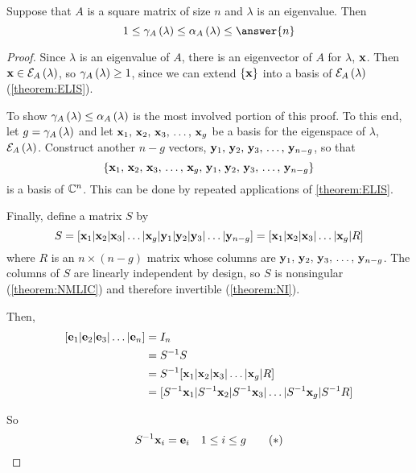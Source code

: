 \documentclass{ximera}
\begin{document}
\begin{theorem}
\label{theorem:ME}

Suppose that $A$ is a square matrix of size $n$ and $\lambda$ is an eigenvalue.  Then
\[
1\leq\geomult{A}{\lambda}\leq\algmult{A}{\lambda}\leq \answer{n}
\]

\begin{proof}
Since $\lambda$ is an eigenvalue of $A$, there is an eigenvector of $A$ for $\lambda$, $\mathbf{x}$.  Then $\mathbf{x}\in\mathcal{E}_{A}\left(\lambda\right)$, so $\gamma_{A}\left(\lambda\right)\geq 1$, since we can extend $\left\{\mathbf{x}\right\}$ into a basis of $\mathcal{E}_{A}\left(\lambda\right)$ (\ref{theorem:ELIS}).

To show $\gamma_{A}\left(\lambda\right)\leq\alpha_{A}\left(\lambda\right)$ is the most involved portion of this proof.  To this end, let $g=\gamma_{A}\left(\lambda\right)$ and let $\mathbf{x}_{1},\,\mathbf{x}_{2},\,\mathbf{x}_{3},\,\ldots,\,\mathbf{x}_{g}$ be a basis for the eigenspace of $\lambda$, $\mathcal{E}_{A}\left(\lambda\right)$.  Construct another $n-g$ vectors, $\mathbf{y}_{1},\,\mathbf{y}_{2},\,\mathbf{y}_{3},\,\ldots,\,\mathbf{y}_{n-g}$, so that
\[
\left\{\mathbf{x}_{1},\,\mathbf{x}_{2},\,\mathbf{x}_{3},\,\ldots,\,\mathbf{x}_{g},\,\mathbf{y}_{1},\,\mathbf{y}_{2},\,\mathbf{y}_{3},\,\ldots,\,\mathbf{y}_{n-g}\right\}
\]
is a basis of $\mathbb{C}^{n}$.  This can be done by repeated applications of \ref{theorem:ELIS}.



Finally, define a matrix $S$ by
\[
S=[\mathbf{x}_1|\mathbf{x}_2|\mathbf{x}_3|\ldots|\mathbf{x}_g|\mathbf{y}_1|\mathbf{y}_2|\mathbf{y}_3|\ldots|\mathbf{y}_{n-g}]
=[\mathbf{x}_1|\mathbf{x}_2|\mathbf{x}_3|\ldots|\mathbf{x}_g|R]
\]
where $R$ is an $n\times(n-g)$ matrix whose columns are $\mathbf{y}_{1},\,\mathbf{y}_{2},\,\mathbf{y}_{3},\,\ldots,\,\mathbf{y}_{n-g}$.  The columns of $S$ are linearly independent by design, so $S$ is nonsingular (\ref{theorem:NMLIC}) and therefore invertible (\ref{theorem:NI}).



Then,
\begin{align*}
\left\lbrack\mathbf{e}_{1}|\mathbf{e}_{2}|\mathbf{e}_{3}|\ldots|\mathbf{e}_{n}\right\rbrack&=I_n\\
&=S^{-1}S\\
&=S^{-1}[\mathbf{x}_1|\mathbf{x}_2|\mathbf{x}_3|\ldots|\mathbf{x}_g|R]\\
&=[S^{-1}\mathbf{x}_1|S^{-1}\mathbf{x}_2|S^{-1}\mathbf{x}_3|\ldots|S^{-1}\mathbf{x}_g|S^{-1}R]
\end{align*}




So
\[
S^{-1}\mathbf{x}_i=\mathbf{e}_i\quad 1\leq i\leq g\tag{$*$}
\]





\end{proof}
\end{theorem}
\end{document}
